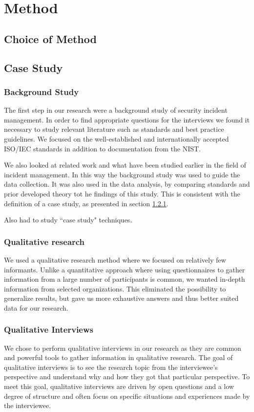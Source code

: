 \chapter{Method}
\section{Choice of Method}


\section{Case Study}


\subsection{Background Study}
\label{sec:caseStudy}
\label{sec:background}
The first step in our research were a background study of security incident management. In order to find appropriate questions for the interviews we found it necessary to study relevant literature such as standards and best practice guidelines. We focused on the well-established and internationally accepted ISO/IEC standards in addition to documentation from the \ac{NIST}.

We also looked at related work and what have been studied earlier in the field of incident management. In this way the background study was used to guide the data collection. It was also used in the data analysis, by comparing standards and prior developed theory tot he findings of this study. This is consistent with the definition of a case study, as presented in section \ref{sec:caseStudy}.

Also had to study ``case study" techniques.

\subsection{Qualitative research}
We used a qualitative research method where we focused on relatively few informants. Unlike a quantitative approach where using questionnaires to gather information from a large number of participants is common, we wanted in-depth information from selected organizations. This eliminated the possibility to generalize results, but gave us more exhaustive answers and thus better suited data for our research.

\subsection{Qualitative Interviews}
\label{sec:interviews}
We chose to perform qualitative interviews in our research as they are common and powerful tools to gather information in qualitative research\cite{myers2007qualitative}. The goal of qualitative interviews is to see the research topic from the interviewee's perspective and understand why and how they got that particular perspective\cite{cassell2004essential}. To meet this goal, qualitative interviews are driven by open questions and a low degree of structure and often focus on specific situations and experiences made by the interviewee. 

